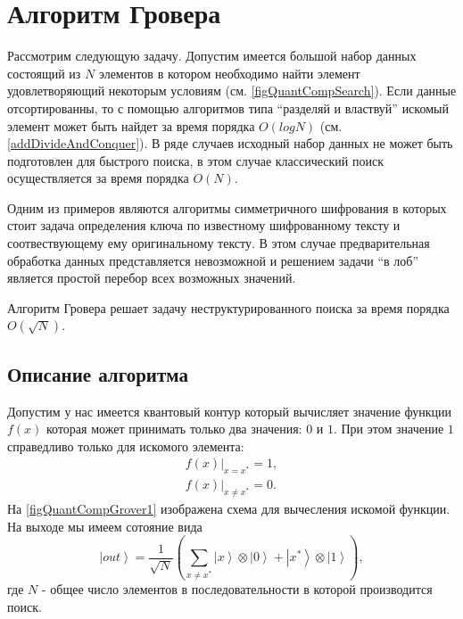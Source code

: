 \section{Алгоритм Гровера}
Рассмотрим следующую задачу. Допустим имеется большой набор данных
состоящий из $N$ элементов в котором необходимо найти элемент
удовлетворяющий некоторым условиям (см. \autoref{figQuantCompSearch}).
Если данные отсортированны, то с  
помощью алгоритмов типа ``разделяй и властвуй'' искомый элемент может
быть найдет за время порядка $O\left(log N\right)$
(см. \autoref{addDivideAndConquer}). В ряде случаев исходный набор данных
не может быть подготовлен для быстрого поиска, в этом случае
классический поиск осуществляется за время порядка $O\left(N\right)$.



Одним из примеров являются алгоритмы симметричного шифрования в
которых стоит задача определения ключа по известному шифрованному
тексту и соотвествующему ему оригинальному тексту. В этом случае
предварительная обработка данных представляется невозможной и решением
задачи ``в лоб'' является простой перебор всех возможных значений.

Алгоритм Гровера \cite{Grover96afast} решает задачу
неструктурированного поиска за время порядка $O\left(\sqrt{N}\right)$.

\subsection{Описание алгоритма}

Допустим у нас имеется квантовый контур который вычисляет значение
функции $f\left(x\right)$ которая может принимать только два значения:
$0$ и $1$. При этом значение $1$ справедливо только для искомого
элемента: 
\begin{eqnarray}
\left.f\left(x\right)\right|_{x = x^{\ast}} = 1,
\nonumber \\
\left.f\left(x\right)\right|_{x \ne x^{\ast}} = 0.
\label{eqQuantCompGroverF}
\end{eqnarray}
На \autoref{figQuantCompGrover1} изображена схема для вычесления
искомой функции. На выходе мы имеем сотояние вида
\begin{equation}
\left|out\right> = \frac{1}{\sqrt{N}}\left(
 \sum_{x \ne x^{\ast}} \left|x\right>\otimes\left|0\right>
+ \left|x^{\ast}\right>\otimes\left|1\right>
\right),
\label{eqQuantCompGroverFake}
\end{equation}
где $N$ - общее число элементов в последовательности в которой
производится поиск.

